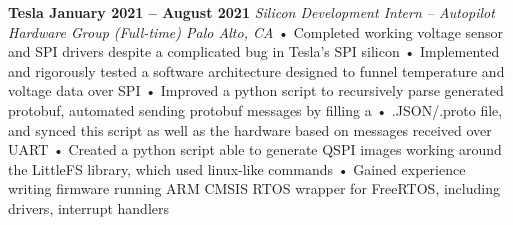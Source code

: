 \documentclass[../main.tex]{subfiles}
\begin{document}
%
\noindent\textbf{{\fontsize{\textFontSize}{\textFontBox}\selectfont Tesla \hfill January 2021 – August 2021}}
\vspace{1mm}\newline
%
{\fontsize{\textFontSize}{\textFontBox}\selectfont\emph{Silicon Development Intern – Autopilot Hardware Group (Full-time) \hfill Palo Alto, CA \hspace{0 cm}}}
\vspace{-0mm}\newline
%
%
{\fontsize{\textFontSize}{\textFontBox}\selectfont • Completed working voltage sensor and SPI drivers despite a complicated bug in Tesla’s SPI silicon }\newline
{\fontsize{\textFontSize}{\textFontBox}\selectfont • Implemented and rigorously tested a software architecture designed to funnel temperature and voltage data over SPI }\newline
{\fontsize{\textFontSize}{\textFontBox}\selectfont • Improved a python script to recursively parse generated protobuf, automated sending protobuf messages by filling a }\newline
{\fontsize{\textFontSize}{\textFontBox}\selectfont • .JSON/.proto file, and synced this script as well as the hardware based on messages received over UART }\newline
{\fontsize{\textFontSize}{\textFontBox}\selectfont • Created a python script able to generate QSPI images working around the LittleFS library, which used linux-like commands }\newline
{\fontsize{\textFontSize}{\textFontBox}\selectfont • Gained experience writing firmware running ARM CMSIS RTOS wrapper for FreeRTOS, including drivers, interrupt handlers }
\vspace{-8mm}\newline
\end{document}
